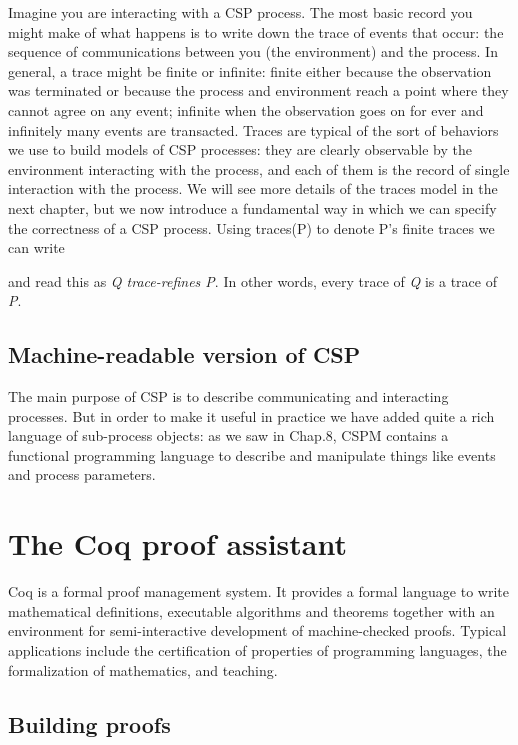 Imagine you are interacting with a CSP process. The most basic record you might make of what happens is to write down the trace of events that occur: the sequence of communications between you (the environment) and the process. In general, a trace might be finite or infinite: finite either because the observation was terminated or because the process and environment reach a point where they cannot agree on any event; infinite when the observation goes on for ever and infinitely many events are transacted. Traces are typical of the sort of behaviors we use to build models of CSP processes: they are clearly observable by the environment interacting with the process, and each of them is the record of single interaction with the process. We will see more details of the traces model in the next chapter, but we now introduce a fundamental way in which we can specify the correctness of a CSP process. Using traces(P) to denote P’s finite traces we can write

and read this as \emph{Q trace-refines P}. In other words, every trace of \emph{Q} is a trace of \emph{P}.

\subsection{Machine-readable version of CSP}

The main purpose of CSP is to describe communicating and interacting processes. But in order to make it useful in practice we have added quite a rich language of sub-process objects: as we saw in Chap.8, CSPM contains a functional programming language to describe and manipulate things like events and process parameters.

\section{The Coq proof assistant}

Coq is a formal proof management system. It provides a formal language to write mathematical definitions, executable algorithms and theorems together with an environment for semi-interactive development of machine-checked proofs. Typical applications include the certification of properties of programming languages, the formalization of mathematics, and teaching. 

\subsection{Building proofs}

